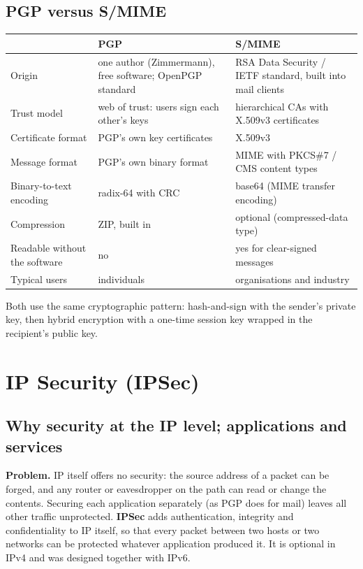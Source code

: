 \subsection{PGP versus S/MIME \new}
\begin{center}\small
\begin{tabularx}{\textwidth}{@{}l *{2}{>{\raggedright\arraybackslash}X}@{}}
\toprule
 & PGP & S/MIME\\
\midrule
Origin & one author (Zimmermann), free software; OpenPGP standard & RSA Data Security / IETF standard, built into mail clients\\
Trust model & web of trust: users sign each other's keys & hierarchical CAs with X.509v3 certificates\\
Certificate format & PGP's own key certificates & X.509v3\\
Message format & PGP's own binary format & MIME with PKCS\#7 / CMS content types\\
Binary-to-text encoding & radix-64 with CRC & base64 (MIME transfer encoding)\\
Compression & ZIP, built in & optional (compressed-data type)\\
Readable without the software & no & yes for clear-signed messages\\
Typical users & individuals & organisations and industry\\
\bottomrule
\end{tabularx}
\end{center}
Both use the same cryptographic pattern: hash-and-sign with the sender's private key, then hybrid encryption with a one-time session key wrapped in the recipient's public key.

\section{IP Security (IPSec)}\label{sec:ipsec}

\subsection{Why security at the IP level; applications and services \new}

\textbf{Problem.} IP itself offers no security: the source address of a packet can be forged, and any router or eavesdropper on the path can read or change the contents. Securing each application separately (as PGP does for mail) leaves all other traffic unprotected. \textbf{IPSec} adds authentication, integrity and confidentiality to IP itself, so that every packet between two hosts or two networks can be protected whatever application produced it. It is optional in IPv4 and was designed together with IPv6.


